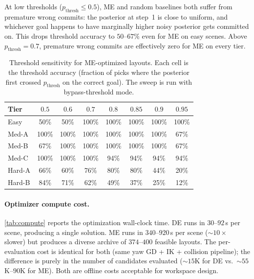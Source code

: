 \documentclass[letterpaper, 10pt, conference]{ieeeconf}
\begin{document}
At low thresholds ($p_{\mathrm{thresh}} {\le} 0.5$), ME and random
baselines both suffer from premature wrong commits: the posterior at
step~1 is close to uniform, and whichever goal happens to have
marginally higher noisy posterior gets committed on.  This drops
threshold accuracy to $50$--$67$\% even for ME on easy scenes.
Above $p_{\mathrm{thresh}} {=} 0.7$, premature wrong commits
are effectively zero for ME on every tier.

\begin{table}[t]
\centering
\caption{Threshold sensitivity for ME-optimized layouts.  Each cell
is the threshold accuracy (fraction of picks where the posterior
first crossed $p_{\mathrm{thresh}}$ on the correct goal).  The sweep
is run with bypass-threshold mode.}
\label{tab:sweep}
\small
\setlength{\tabcolsep}{4pt}
\begin{tabular}{@{}lccccccc@{}}
\toprule
\textbf{Tier} &
  $0.5$ & $0.6$ & $0.7$ & $0.8$ & $0.85$ & $0.9$ & $0.95$ \\
\midrule
Easy   &  50\% &  50\% & 100\% & 100\% & 100\% & 100\% & 100\% \\
Med-A  & 100\% & 100\% & 100\% & 100\% & 100\% & 100\% &  67\% \\
Med-B  &  67\% & 100\% & 100\% & 100\% & 100\% & 100\% &  67\% \\
Med-C  & 100\% & 100\% & 100\% &  94\% &  94\% &  94\% &  94\% \\
Hard-A &  66\% &  60\% &  76\% &  80\% &  80\% &  44\% &  20\% \\
Hard-B &  84\% &  71\% &  62\% &  49\% &  37\% &  25\% &  12\% \\
\bottomrule
\end{tabular}
\end{table}

\paragraph{Optimizer compute cost.}
\cref{tab:compute} reports the optimization wall-clock time.  DE
runs in $30$--$92$\,s per scene, producing a single solution.  ME
runs in $340$--$920$\,s per scene ($\sim 10\times$ slower) but
produces a diverse archive of $374$--$400$ feasible layouts.  The
per-evaluation cost is identical for both (same yaw GD + IK +
collision pipeline); the difference is purely in the number of
candidates evaluated ($\sim 15$K for DE vs.\ $\sim 55$K--$90$K
for ME).  Both are offline costs acceptable for workspace design.
\end{document}
